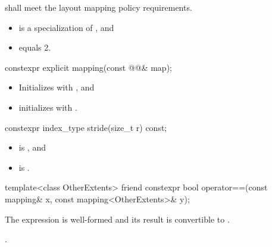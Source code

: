 \pnum
{} shall meet
the layout mapping policy requirements.

\pnum
\mandates
\begin{itemize}
\item
{} is a specialization of , and
\item
{} equals 2.
\end{itemize}

\begin{itemdecl}
constexpr explicit mapping(const @@& map);
\end{itemdecl}

\begin{itemdescr}
\pnum
\effects
\begin{itemize}
\item
Initializes  with , and
\item
initializes 
with .
\end{itemize}
\end{itemdescr}

\begin{itemdecl}
constexpr index_type stride(size_t r) const;
\end{itemdecl}

\begin{itemdescr}

\pnum
\expects
\begin{itemize}
\item
{} is , and
\item
{} is .
\end{itemize}

\pnum
\returns
{}
\end{itemdescr}

\begin{itemdecl}
template<class OtherExtents>
  friend constexpr bool operator==(const mapping& x, const mapping<OtherExtents>& y);
\end{itemdecl}

\begin{itemdescr}
\pnum
\constraints
The expression
is well-formed and its result is convertible to .

\pnum
\returns
{}.
\end{itemdescr}

